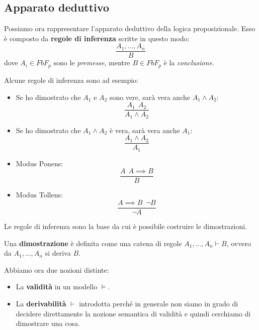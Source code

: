 \subsection{Apparato deduttivo}
Possiamo ora rappresentare l'apparato deduttivo della logica proposizionale. Esso
è composto da \textbf{regole di inferenza} scritte in questo modo:
\begin{equation}
    \frac{A_1, \dots, A_n}{B}
\end{equation}
dove $A_i \in FbF_p$ sono le \textit{premesse}, mentre $B \in FbF_p$ è la
\textit{conclusione}.

Alcune regole di inferenza sono ad esempio:
\begin{itemize}
    \item Se ho dimostrato che $A_1$ e $A_2$ sono vere, sarà vera anche $A_1
              \land A_2$:
          \begin{equation}
              \frac{A_1 \ \ A_2}{A_1 \land A_2}
          \end{equation}
    \item Se ho dimostrato che $A_1 \land A_2$ è vera, sarà vera anche $A_1$:
          \begin{equation}
              \frac{A_1 \land A_2}{A_1}
          \end{equation}
    \item Modus Ponens:
          \begin{equation}
              \frac{A \ \ A \implies B}{B}
          \end{equation}
    \item Modus Tollens:
          \begin{equation}
              \frac{A \implies B \ \ \lnot B}{\lnot A}
          \end{equation}
\end{itemize}
Le regole di inferenza sono la base da cui è possibile costruire le dimostrazioni.
\begin{definizione}
    Una \textbf{dimostrazione} è definita come una catena di regole $A_1, \dots,
        A_n \vdash B$, ovvero da $A_1, \dots, A_n$ si deriva $B$.
\end{definizione}
Abbiamo ora due nozioni distinte:
\begin{itemize}
    \item La \textbf{validità} in un modello $\models$.
    \item La \textbf{derivabilità} $\vdash$ introdotta perché in generale non
          siamo in grado di decidere direttamente la nozione semantica di validità
          e quindi cerchiamo di dimostrare una cosa.
\end{itemize}
